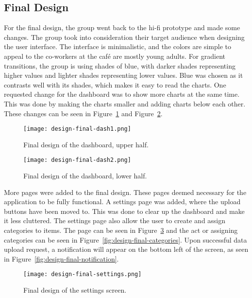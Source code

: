 \subsection{Final Design}\label{subsec:final-design}

For the final design, the group went back to the hi-fi prototype and made some changes.
The group took into consideration their target audience when designing the user interface.
The interface is minimalistic, and the colors are simple to appeal to the co-workers at the café are mostly young
adults.
For gradient transitions, the group is using shades of blue, with darker shades representing higher values and lighter
shades representing lower values.
Blue was chosen as it contrasts well with its shades, which makes it easy to read the charts.
One requested change for the dashboard was to show more charts at the same time.
This was done by making the charts smaller and adding charts below each other.
These changes can be seen in Figure~\ref{fig:design-final-dash1} and Figure~\ref{fig:design-final-dash2}.

\begin{figure}[H]
    \centering
    \texttt{[image: design-final-dash1.png]}
    \caption{Final design of the dashboard, upper half.
    }\label{fig:design-final-dash1}
\end{figure}

\begin{figure}[H]
    \centering
    \texttt{[image: design-final-dash2.png]}
    \caption{Final design of the dashboard, lower half.
    }\label{fig:design-final-dash2}
\end{figure}

More pages were added to the final design.
These pages deemed necessary for the application to be fully functional.
A settings page was added, where the upload buttons have been moved to.
This was done to clear up the dashboard and make it less cluttered.
The settings page also allow the user to create and assign categories to items.
The page can be seen in Figure~\ref{fig:design-final-settings} and the act or assigning categories can be seen in
Figure~\ref{fig:design-final-categories}.
Upon successful data upload request, a notification will appear on the bottom left of the screen, as seen in
Figure~\ref{fig:design-final-notification}.

\begin{figure}[H]
    \centering
    \texttt{[image: design-final-settings.png]}
    \caption{Final design of the settings screen.
    }\label{fig:design-final-settings}
\end{figure}

